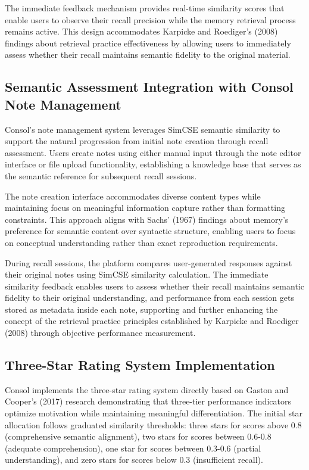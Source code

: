 {{The immediate feedback mechanism provides real-time similarity scores that enable users to observe their recall precision while the memory retrieval process remains active. This design accommodates Karpicke and Roediger's (2008) findings about retrieval practice effectiveness by allowing users to immediately assess whether their recall maintains semantic fidelity to the original material.
}

{\color{maroon}
\subsection{Semantic Assessment Integration with Consol Note Management}

Consol's note management system leverages SimCSE semantic similarity to support the natural progression from initial note creation through recall assessment. Users create notes using either manual input through the note editor interface or file upload functionality, establishing a knowledge base that serves as the semantic reference for subsequent recall sessions.

The note creation interface accommodates diverse content types while maintaining focus on meaningful information capture rather than formatting constraints. This approach aligns with Sachs' (1967) findings about memory's preference for semantic content over syntactic structure, enabling users to focus on conceptual understanding rather than exact reproduction requirements.

During recall sessions, the platform compares user-generated responses against their original notes using SimCSE similarity calculation. The immediate similarity feedback enables users to assess whether their recall maintains semantic fidelity to their original understanding, and performance from each session gets stored as metadata inside each note, supporting and further enhancing the concept of the retrieval practice principles established by Karpicke and Roediger (2008) through objective performance measurement.
}

{\color{maroon}
\subsection{Three-Star Rating System Implementation}

Consol implements the three-star rating system directly based on Gaston and Cooper's (2017) research demonstrating that three-tier performance indicators optimize motivation while maintaining meaningful differentiation. The initial star allocation follows graduated similarity thresholds: three stars for scores above 0.8 (comprehensive semantic alignment), two stars for scores between 0.6-0.8 (adequate comprehension), one star for scores between 0.3-0.6 (partial understanding), and zero stars for scores below 0.3 (insufficient recall).

}}
